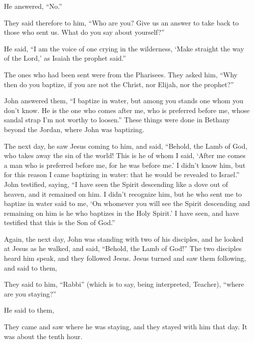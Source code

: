 {\par }{\PP He answered, “No.”
\par }{\PP {}They said therefore to him, “Who are you? Give us an answer to take back to those who sent us. What do you say about yourself?”
\par }{\PP {}He said, “I am the voice of one crying in the wilderness, ‘Make straight the way of the Lord,’ as Isaiah the prophet said.”
\par }{\PP {}The ones who had been sent were from the Pharisees.
They asked him, “Why then do you baptize, if you are not the Christ, nor Elijah, nor the prophet?”
\par }{\PP {}John answered them, “I baptize in water, but among you stands one whom you don’t know.
He is the one who comes after me, who is preferred before me, whose sandal strap I’m not worthy to loosen.”
These things were done in Bethany beyond the Jordan, where John was baptizing.
\par }{\PP {}The next day, he saw Jesus coming to him, and said, “Behold, the Lamb of God, who takes away the sin of the world!
This is he of whom I said, ‘After me comes a man who is preferred before me, for he was before me.’
I didn’t know him, but for this reason I came baptizing in water: that he would be revealed to Israel.”
John testified, saying, “I have seen the Spirit descending like a dove out of heaven, and it remained on him.
I didn’t recognize him, but he who sent me to baptize in water said to me, ‘On whomever you will see the Spirit descending and remaining on him is he who baptizes in the Holy Spirit.’
I have seen, and have testified that this is the Son of God.”
\par }{\PP {}Again, the next day, John was standing with two of his disciples,
and he looked at Jesus as he walked, and said, “Behold, the Lamb of God!”
The two disciples heard him speak, and they followed Jesus.
Jesus turned and saw them following, and said to them,
{}
\par }{\PP They said to him, “Rabbi” (which is to say, being interpreted, Teacher), “where are you staying?”
\par }{\PP {}He said to them,
{}
\par }{\PP They came and saw where he was staying, and they stayed with him that day. It was about the tenth hour.}
